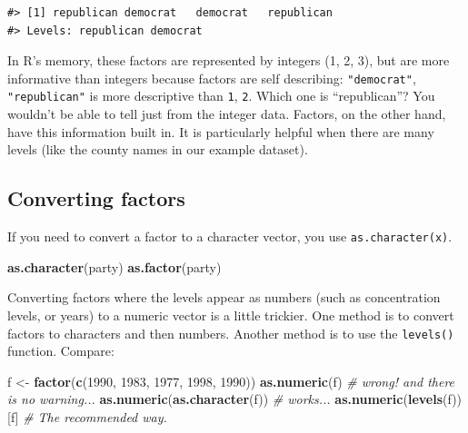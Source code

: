 \documentclass[
]{book}
\newenvironment{Shaded}{\begin{snugshade}}{\end{snugshade}}
\newcommand{\CommentTok}[1]{\textcolor[rgb]{0.56,0.35,0.01}{\textit{#1}}}
\newcommand{\DecValTok}[1]{\textcolor[rgb]{0.00,0.00,0.81}{#1}}
\newcommand{\KeywordTok}[1]{\textcolor[rgb]{0.13,0.29,0.53}{\textbf{#1}}}
\newcommand{\NormalTok}[1]{#1}
\newcommand{\StringTok}[1]{\textcolor[rgb]{0.31,0.60,0.02}{#1}}
\begin{document}
\begin{verbatim}
#> [1] republican democrat   democrat   republican
#> Levels: republican democrat
\end{verbatim}

In R's memory, these factors are represented by integers (1, 2, 3), but are more
informative than integers because factors are self describing: \texttt{"democrat"},
\texttt{"republican"} is more descriptive than \texttt{1}, \texttt{2}. Which one is ``republican''? You wouldn't
be able to tell just from the integer data. Factors, on the other hand, have
this information built in. It is particularly helpful when there are many levels
(like the county names in our example dataset).

\hypertarget{converting-factors}{%
\subsection{Converting factors}\label{converting-factors}}

If you need to convert a factor to a character vector, you use
\texttt{as.character(x)}.

\begin{Shaded}
\begin{Highlighting}[]
\KeywordTok{as.character}\NormalTok{(party)}
\KeywordTok{as.factor}\NormalTok{(party)}
\end{Highlighting}
\end{Shaded}

Converting factors where the levels appear as numbers (such as concentration
levels, or years) to a numeric vector is a little trickier. One method is to
convert factors to characters and then numbers. Another method is to use the
\texttt{levels()} function. Compare:

\begin{Shaded}
\begin{Highlighting}[]
\NormalTok{f <-}\StringTok{ }\KeywordTok{factor}\NormalTok{(}\KeywordTok{c}\NormalTok{(}\DecValTok{1990}\NormalTok{, }\DecValTok{1983}\NormalTok{, }\DecValTok{1977}\NormalTok{, }\DecValTok{1998}\NormalTok{, }\DecValTok{1990}\NormalTok{))}
\KeywordTok{as.numeric}\NormalTok{(f)               }\CommentTok{# wrong! and there is no warning...}
\KeywordTok{as.numeric}\NormalTok{(}\KeywordTok{as.character}\NormalTok{(f)) }\CommentTok{# works...}
\KeywordTok{as.numeric}\NormalTok{(}\KeywordTok{levels}\NormalTok{(f))[f]    }\CommentTok{# The recommended way.}
\end{Highlighting}
\end{Shaded}
\end{document}
